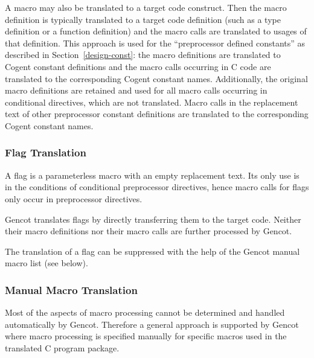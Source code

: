 A macro may also be translated to a target code construct. Then the macro definition is typically translated to 
a target code definition (such as a type definition or a function definition) and the macro calls are translated
to usages of that definition. This approach is used for the ``preprocessor defined constants'' as described in 
Section~\ref{design-const}: the macro definitions are translated to Cogent constant definitions and the macro 
calls occurring in C code are translated to the corresponding Cogent constant names. Additionally, the original
macro definitions are retained and used for all macro calls occurring in conditional directives, which are not
translated. Macro calls in the replacement text of other preprocessor constant definitions are translated to 
the corresponding Cogent constant names.

\subsubsection{Flag Translation}

A flag is a parameterless macro with an empty replacement text. Its only use is in the conditions of 
conditional preprocessor directives, hence macro calls for flags only occur in preprocessor directives.

Gencot translates flags by directly transferring them to the target code. Neither their macro definitions 
nor their macro calls are further processed by Gencot.

The translation of a flag can be suppressed with the help of the Gencot manual macro list (see below).

\subsubsection{Manual Macro Translation}

Most of the aspects of macro processing cannot be determined and handled automatically by Gencot. Therefore a
general approach is supported by Gencot where macro processing is specified manually for specific macros used in the
translated C program package.

